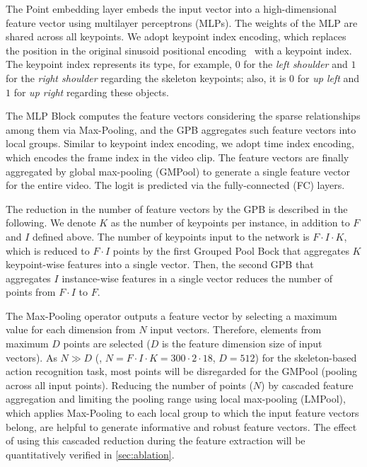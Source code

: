 \documentclass[10pt,twocolumn,letterpaper]{article}
\begin{document}
The Point embedding layer embeds the input vector into a high-dimensional feature vector using multilayer perceptrons (MLPs).
The weights of the MLP are shared across all keypoints.
We adopt keypoint index encoding, which replaces the position in the original sinusoid positional encoding~\cite{Vaswani2017Neurips} with a keypoint index.
The keypoint index represents its type, for example, $0$ for the \textit{left shoulder} and $1$ for the \textit{right shoulder} regarding the skeleton keypoints; also, it is $0$ for \textit{up left} and $1$ for \textit{up right} regarding these objects.

The MLP Block computes the feature vectors considering the sparse relationships among them via Max-Pooling, and the GPB aggregates such feature vectors into local groups.
Similar to keypoint index encoding, we adopt time index encoding, which encodes the frame index in the video clip.
The feature vectors are finally aggregated by global max-pooling (GMPool) to generate a single feature vector for the entire video.
The logit is predicted via the fully-connected (FC) layers.

The reduction in the number of feature vectors by the GPB is described in the following.
We denote $K$ as the number of keypoints per instance, in addition to $F$ and $I$ defined above.
The number of keypoints input to the network is $F \cdot I \cdot K$, which is reduced to $F \cdot I$ points by the first Grouped Pool Bock that aggregates $K$ keypoint-wise features into a single vector.
Then, the second GPB that aggregates $I$ instance-wise features in a single vector reduces the number of points from $F \cdot I$ to $F$.

The Max-Pooling operator outputs a feature vector by selecting a maximum value for each dimension from $N$ input vectors.
Therefore, elements from maximum $D$ points are selected ($D$ is the feature dimension size of input vectors).
As $N \gg D$ (\eg, $N = F \cdot I \cdot K = 300 \cdot 2 \cdot 18$, $D = 512$) for the skeleton-based action recognition task, most points will be disregarded for the GMPool (pooling across all input points).
Reducing the number of points ($N$) by cascaded feature aggregation and limiting the pooling range using local max-pooling (LMPool), which applies Max-Pooling to each local group to which the input feature vectors belong, are helpful to generate informative and robust feature vectors. The effect of using this cascaded reduction during the feature extraction will be quantitatively verified in \cref{sec:ablation}.
\end{document}
